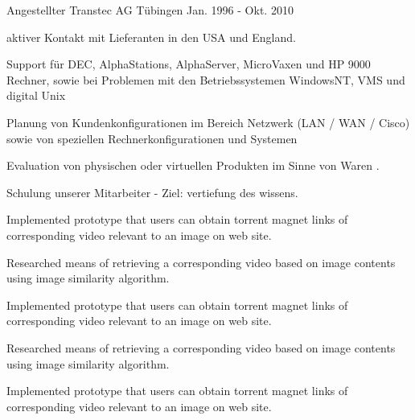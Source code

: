 \begin{cventries}
  \cventry
    {Angestellter} %
    {Transtec AG} %
    {Tübingen } %
    {Jan. 1996 - Okt. 2010} %
    {
      \begin{cvitems} %
        \item {aktiver Kontakt mit Lieferanten in den USA und England.}
        \item {Support für DEC, AlphaStations, AlphaServer, MicroVaxen und HP 9000 Rechner, sowie bei Problemen mit den Betriebssystemen WindowsNT, VMS und digital Unix}
        \item {Planung von Kundenkonfigurationen im Bereich Netzwerk (LAN / WAN / Cisco) sowie von speziellen Rechnerkonfigurationen und Systemen}
        \item {Evaluation von physischen oder virtuellen Produkten im Sinne von Waren .}
        \item {Schulung unserer Mitarbeiter - Ziel: vertiefung des wissens.}
        \item {Implemented prototype that users can obtain torrent magnet links of corresponding video relevant to an image on web site.}
        \item {Researched means of retrieving a corresponding video based on image contents using image similarity algorithm.}
        \item {Implemented prototype that users can obtain torrent magnet links of corresponding video relevant to an image on web site.}
        \item {Researched means of retrieving a corresponding video based on image contents using image similarity algorithm.}
        \item {Implemented prototype that users can obtain torrent magnet links of corresponding video relevant to an image on web site.}
      \end{cvitems}
    }

\end{cventries}
